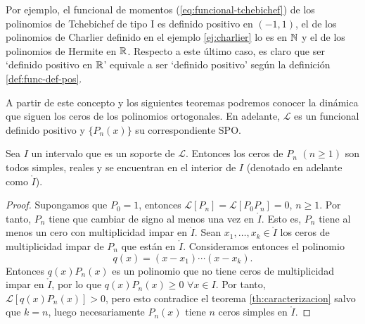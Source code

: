 Por ejemplo, el funcional de momentos (\ref{eq:funcional-tchebichef}) de los polinomios de Tchebichef de tipo I es definido positivo en $(-1,1)$, el de los polinomios de Charlier definido en el ejemplo \ref{ej:charlier} lo es en $\mathbb{N}$ y el de los polinomios de Hermite en $\mathbb{R}$. Respecto a este último caso, es claro que ser `definido positivo en $\mathbb{R}$' equivale a ser `definido positivo' según la definición \ref{def:func-def-pos}.

A partir de este concepto y los siguientes teoremas podremos conocer la dinámica que siguen los ceros de los polinomios ortogonales. En adelante, $\mathcal{L}$ es un funcional definido positivo y $\{P_n(x)\}$ su correspondiente SPO.

\begin{teorema}
    Sea $I$ un intervalo que es un soporte de $\mathcal{L}$. Entonces los ceros de $P_n$ $(n\geq 1)$ son todos simples, reales y se encuentran en el interior de $I$ (denotado en adelante como $\mathring{I}$).
\end{teorema}
\begin{proof}
    Supongamos que $P_0 = 1$, entonces $\mathcal{L}[P_n] = \mathcal{L}[P_0 P_n] = 0$, $n\geq 1$. Por tanto, $P_n$ tiene que cambiar de signo al menos una vez en $\mathring I$. Esto es, $P_n$ tiene al menos un cero con multiplicidad impar en $\mathring I$. Sean $x_1, \dots, x_k\in \mathring I$ los ceros de multiplicidad impar de $P_n$ que están en $\mathring{I}$. Consideramos entonces el polinomio 
    $$
    q(x) = (x-x_1)\cdots(x-x_k).
    $$
    Entonces $q(x)P_n(x)$ es un polinomio que no tiene ceros de multiplicidad impar en $\mathring{I}$, por lo que $q(x)P_n(x)\geq 0$ $\forall x\in I$. Por tanto, $\mathcal L[q(x)P_n(x)]>0$, pero esto contradice el teorema \ref{th:caracterizacion} salvo que $k=n$, luego necesariamente $P_n(x)$ tiene $n$ ceros simples en $\mathring I$.
\end{proof}

